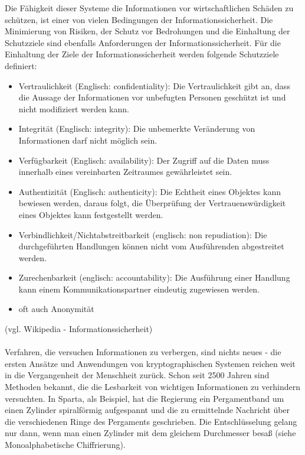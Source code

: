 \documentclass[12pt,a4paper]{report}
\begin{document}
\begin{onehalfspace}
Die Fähigkeit dieser Systeme die Informationen vor wirtschaftlichen Schäden zu schützen, ist einer von vielen Bedingungen der Informationssicherheit. Die Minimierung von Risiken, der Schutz vor Bedrohungen und die Einhaltung der Schutzziele sind ebenfalls Anforderungen der Informationssicherheit. Für die Einhaltung der Ziele der Informationssicherheit werden folgende Schutzziele definiert:

\begin{itemize}
\item Vertraulichkeit (Englisch: confidentiality): Die Vertraulichkeit gibt an, dass die Aussage der Informationen vor unbefugten Personen geschützt ist und nicht modifiziert werden kann.
\item Integrität (Englisch: integrity): Die unbemerkte Veränderung von Informationen darf nicht möglich sein.
\item Verfügbarkeit (Englisch: availability): Der Zugriff auf die Daten muss innerhalb eines vereinbarten Zeitraumes gewährleistet sein.
\item Authentizität (Englisch: authenticity): Die Echtheit eines Objektes kann bewiesen werden, daraus folgt, die Überprüfung der Vertrauenswürdigkeit eines Objektes kann festgestellt werden.
\item Verbindlichkeit/Nichtabstreitbarkeit (englisch: non repudiation): Die durchgeführten Handlungen können nicht vom Ausführenden abgestreitet werden.
\item Zurechenbarkeit (englisch: accountability): Die Ausführung einer Handlung kann einem Kommunikationspartner eindeutig zugewiesen werden.
\item oft auch Anonymität
\end{itemize}

(vgl. Wikipedia - Informationssicherheit)\\\\

Verfahren, die versuchen Informationen zu verbergen, sind nichts neues - die ersten Ansätze und Anwendungen von kryptographischen Systemen reichen weit in die Vergangenheit der Menschheit zurück. Schon seit 2500 Jahren sind Methoden bekannt, die die Lesbarkeit von wichtigen Informationen zu verhindern versuchten. In Sparta, als Beispiel, hat die Regierung ein Pergamentband um einen Zylinder spiralförmig aufgespannt und die zu ermittelnde Nachricht über die verschiedenen Ringe des Pergaments geschrieben. Die Entschlüsselung gelang nur dann, wenn man einen Zylinder mit dem gleichem Durchmesser besaß (siehe Monoalphabetische Chiffrierung).\\


\end{onehalfspace}
\end{document}
